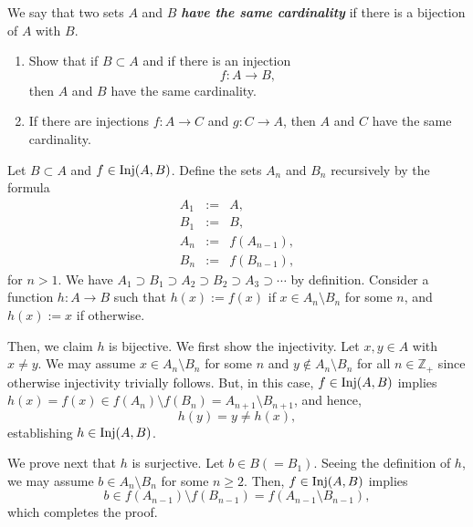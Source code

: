 \documentclass[a4paper,12pt]{article}
\begin{document}
\begin{exe}
	We say that two sets \( A \) and \( B \)
	\textbf{\textit{have the same cardinality}}
	if there is a bijection of \( A \) with \( B \).
	\begin{enumerate}
		\item
		      Show that if \( B \subset A \) and if there is an injection
		      \begin{equation*}
			      f:A \to B,
		      \end{equation*}
		      then \( A \) and \( B \) have the same cardinality.
		      
		\item
		      \;\;
		      If there are injections
		      \( f:A\to C \)
		      and
		      \( g:C \to A \),
		      then \( A \) and \( C \) have the same cardinality.
	\end{enumerate}
\end{exe}\begin{sol}\leavevmode \par
	Let \( B \subset A \) and \( f\in \mathrm{Inj}(A,B) \).
	Define the sets \( A_n \)  and \( B_n \) recursively by the formula
	\begin{eqnarray*}
		A_1&:=&A,\\
		B_1&:=&B,\\
		A_n&:=&f(A_{n-1}),\\
		B_n&:=&f(B_{n-1}),
	\end{eqnarray*}
	for \( n>1 \).
	We have
	\( A_1 \supset B_1 \supset A_2 \supset B_2 \supset A_3 \supset \cdots \)
	by definition.
	Consider a function \( h:A\to B \) such that
	\( h(x):=f(x) \)
	if
	\( x\in A_n\setminus B_n \)
	for some \( n \), and
	\( h(x):=x \) if otherwise.
	
	Then, we claim \( h \) is bijective.
	We first show the injectivity.
	Let \( x,y \in A \)
	with
	\( x \neq y \).
	We may assume
	\( x\in A_n\setminus B_n \)
	for some \( n \) and
	\( y \notin A_n\setminus B_n \)
	for all
	\( n \in \mathbb{Z}_{+} \)
	since otherwise injectivity trivially follows.
	But, in this case,
	\( f \in \mathrm{Inj}(A,B) \) implies
	\( h(x)=f(x) \in f(A_n)\setminus f(B_n)=A_{n+1}\setminus B_{n+1} \),
	and hence,
	\begin{equation*}
		h(y)=y \neq h(x),
	\end{equation*}
	establishing \( h\in \mathrm{Inj}(A,B) \).
	
	We prove next that \( h \) is surjective.
	Let \( b \in B(=B_1) \).
	Seeing the definition of \( h \),
	we may assume
	\( b \in A_n \setminus B_n \)
	for some
	\( n \ge 2 \).
	Then,
	\( f \in \mathrm{Inj}(A,B) \) implies
	\begin{equation*}
		b \in f(A_{n-1})\setminus f(B_{n-1})=f(A_{n-1} \setminus B_{n-1}),
	\end{equation*}
	which completes the proof.
	

\end{sol}
\end{document}
